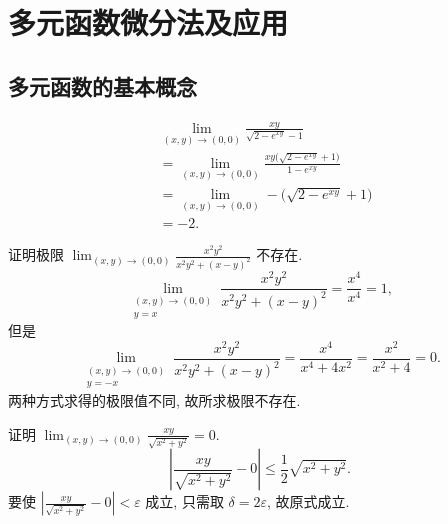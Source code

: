 \documentclass[a4paper,10pt,fleqn]{article}
\begin{document}
\section{多元函数微分法及应用}

\subsection{多元函数的基本概念}

\begin{exmp}
    \begin{align*}
         & \lim_{(x,y)\to(0,0)}\frac{xy}{\sqrt{2-e^{xy}}-1}                    \\
         & =\lim_{(x,y)\to(0,0)}\frac{xy\big(\sqrt{2-e^{xy}}+1\big)}{1-e^{xy}} \\
         & =\lim_{(x,y)\to(0,0)}-\big(\sqrt{2-e^{xy}}+1\big)                   \\
         & =-2.
    \end{align*}
\end{exmp}

\begin{exmp}
    证明极限 $\lim_{(x,y)\to(0,0)}\frac{x^2y^2}{x^2y^2+(x-y)^2}$ 不存在.
    \[
        \lim_{\substack{(x,y)\to(0,0)\\y=x}}\frac{x^2y^2}{x^2y^2+(x-y)^2}
        =\frac{x^4}{x^4}=1,
    \]
    但是
    \[
        \lim_{\substack{(x,y)\to(0,0)\\y=-x}}\frac{x^2y^2}{x^2y^2+(x-y)^2}
        =\frac{x^4}{x^4+4x^2}=\frac{x^2}{x^2+4}=0.
    \]
    两种方式求得的极限值不同, 故所求极限不存在.
\end{exmp}

\begin{exmp}
    证明 $\lim_{(x,y)\to(0,0)}\frac{xy}{\sqrt{x^2+y^2}}=0$.
    \[
        \left|\frac{xy}{\sqrt{x^2+y^2}}-0\right|\leq\frac{1}{2}\sqrt{x^2+y^2}.
    \]
    要使 $\left|\frac{xy}{\sqrt{x^2+y^2}}-0\right|<\varepsilon$ 成立, 只需取 $\delta=2\varepsilon$, 故原式成立.
\end{exmp}
\end{document}
